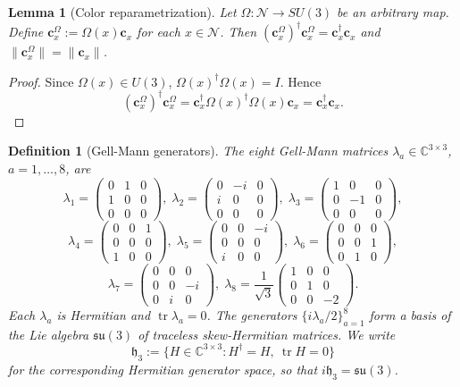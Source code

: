\documentclass[11pt]{article}
\newtheorem{definition}[theorem]{Definition}
\newtheorem{lemma}[theorem]{Lemma}
\theoremstyle{remark}
\newcommand{\C}{\mathbb C}
\newcommand{\mcN}{\mathcal N}
\newcommand{\tr}{\operatorname{tr}}
\newcommand{\mathfrakh}{\mathfrak h_3}
\begin{document}
\begin{lemma}[Color reparametrization]
\label{lem:color-reparam}
Let $\Omega:\mcN\to SU(3)$ be an arbitrary map.
Define $\mathbf c_x^\Omega:=\Omega(x)\mathbf c_x$ for each $x\in\mcN$.
Then $(\mathbf c_x^\Omega)^\dagger\mathbf c_x^\Omega=\mathbf c_x^\dagger\mathbf c_x$
and $\|\mathbf c_x^\Omega\|=\|\mathbf c_x\|$.
\end{lemma}
\begin{proof}
Since $\Omega(x)\in U(3)$, $\Omega(x)^\dagger\Omega(x)=I$.
Hence
\[
(\mathbf c_x^\Omega)^\dagger\mathbf c_x^\Omega
=\mathbf c_x^\dagger\Omega(x)^\dagger\Omega(x)\mathbf c_x=\mathbf c_x^\dagger\mathbf c_x.
\]
\end{proof}

\begin{definition}[Gell-Mann generators]
\label{def:gellmann}
The eight Gell-Mann matrices $\lambda_a\in\C^{3\times3}$, $a=1,\dots,8$, are
\[
\lambda_1=\begin{pmatrix}0&1&0\\1&0&0\\0&0&0\end{pmatrix},\;
\lambda_2=\begin{pmatrix}0&-i&0\\ i&0&0\\0&0&0\end{pmatrix},\;
\lambda_3=\begin{pmatrix}1&0&0\\0&-1&0\\0&0&0\end{pmatrix},
\]
\[
\lambda_4=\begin{pmatrix}0&0&1\\0&0&0\\1&0&0\end{pmatrix},\;
\lambda_5=\begin{pmatrix}0&0&-i\\0&0&0\\ i&0&0\end{pmatrix},\;
\lambda_6=\begin{pmatrix}0&0&0\\0&0&1\\0&1&0\end{pmatrix},
\]
\[
\lambda_7=\begin{pmatrix}0&0&0\\0&0&-i\\0&i&0\end{pmatrix},\;
\lambda_8=\frac1{\sqrt3}\begin{pmatrix}1&0&0\\0&1&0\\0&0&-2\end{pmatrix}.
\]
Each $\lambda_a$ is Hermitian and $\operatorname{tr}\lambda_a=0$.
The generators $\{i\lambda_a/2\}_{a=1}^8$ form a basis of the Lie algebra
$\mathfrak{su}(3)$ of traceless skew-Hermitian matrices.
We write
\[
\mathfrakh:=\{H\in\C^{3\times3}:H^\dagger=H,\ \tr H=0\}
\]
for the corresponding Hermitian generator space, so that $i\mathfrakh=\mathfrak{su}(3)$.
\end{definition}
\end{document}
